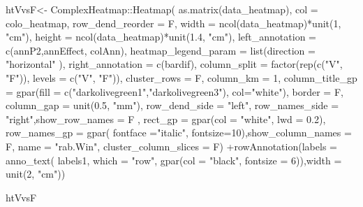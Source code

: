 \documentclass[]{interact}
\theoremstyle{plain}%
\theoremstyle{definition}
\theoremstyle{remark}
\newenvironment{Shaded}{\begin{snugshade}}{\end{snugshade}}
\newcommand{\AttributeTok}[1]{\textcolor[rgb]{0.77,0.63,0.00}{#1}}
\newcommand{\DecValTok}[1]{\textcolor[rgb]{0.00,0.00,0.81}{#1}}
\newcommand{\FloatTok}[1]{\textcolor[rgb]{0.00,0.00,0.81}{#1}}
\newcommand{\FunctionTok}[1]{\textcolor[rgb]{0.00,0.00,0.00}{#1}}
\newcommand{\NormalTok}[1]{#1}
\newcommand{\OtherTok}[1]{\textcolor[rgb]{0.56,0.35,0.01}{#1}}
\newcommand{\SpecialCharTok}[1]{\textcolor[rgb]{0.00,0.00,0.00}{#1}}
\newcommand{\StringTok}[1]{\textcolor[rgb]{0.31,0.60,0.02}{#1}}
\begin{document}
\begin{Shaded}
\begin{Highlighting}[]
\NormalTok{htVvsF}\OtherTok{\textless{}{-}}\NormalTok{  ComplexHeatmap}\SpecialCharTok{::}\FunctionTok{Heatmap}\NormalTok{(}
  \FunctionTok{as.matrix}\NormalTok{(data\_heatmap), }\AttributeTok{col =}\NormalTok{ colo\_heatmap, }\AttributeTok{row\_dend\_reorder =}\NormalTok{ F,                                   }\AttributeTok{width =} \FunctionTok{ncol}\NormalTok{(data\_heatmap)}\SpecialCharTok{*}\FunctionTok{unit}\NormalTok{(}\DecValTok{1}\NormalTok{, }\StringTok{"cm"}\NormalTok{),}
  \AttributeTok{height =} \FunctionTok{ncol}\NormalTok{(data\_heatmap)}\SpecialCharTok{*}\FunctionTok{unit}\NormalTok{(}\FloatTok{1.4}\NormalTok{, }\StringTok{"cm"}\NormalTok{),}
  \AttributeTok{left\_annotation =}  \FunctionTok{c}\NormalTok{(annP2,annEffect, colAnn),}
  \AttributeTok{heatmap\_legend\_param =} \FunctionTok{list}\NormalTok{(}\AttributeTok{direction =} \StringTok{"horizontal"}\NormalTok{ ),}
  \AttributeTok{right\_annotation =} \FunctionTok{c}\NormalTok{(bardif),}
  \AttributeTok{column\_split =} \FunctionTok{factor}\NormalTok{(}\FunctionTok{rep}\NormalTok{(}\FunctionTok{c}\NormalTok{(}\StringTok{"V"}\NormalTok{, }\StringTok{"F"}\NormalTok{)), }\AttributeTok{levels =} \FunctionTok{c}\NormalTok{(}\StringTok{"V"}\NormalTok{, }\StringTok{"F"}\NormalTok{)),}
  \AttributeTok{cluster\_rows =}\NormalTok{ F, }\AttributeTok{column\_km =} \DecValTok{1}\NormalTok{, }
  \AttributeTok{column\_title\_gp =} \FunctionTok{gpar}\NormalTok{(}\AttributeTok{fill =} \FunctionTok{c}\NormalTok{(}\StringTok{"darkolivegreen1"}\NormalTok{,}\StringTok{"darkolivegreen3"}\NormalTok{), }\AttributeTok{col=}\StringTok{"white"}\NormalTok{),}
  \AttributeTok{border =}\NormalTok{ F, }\AttributeTok{column\_gap =} \FunctionTok{unit}\NormalTok{(}\FloatTok{0.5}\NormalTok{, }\StringTok{"mm"}\NormalTok{), }\AttributeTok{row\_dend\_side =} \StringTok{"left"}\NormalTok{,}
  \AttributeTok{row\_names\_side =} \StringTok{"right"}\NormalTok{,}\AttributeTok{show\_row\_names =}\NormalTok{ F ,}
  \AttributeTok{rect\_gp =} \FunctionTok{gpar}\NormalTok{(}\AttributeTok{col =} \StringTok{"white"}\NormalTok{, }\AttributeTok{lwd =} \FloatTok{0.2}\NormalTok{), }\AttributeTok{row\_names\_gp =} \FunctionTok{gpar}\NormalTok{(}
  \AttributeTok{fontface =}\StringTok{"italic"}\NormalTok{, }\AttributeTok{fontsize=}\DecValTok{10}\NormalTok{),}\AttributeTok{show\_column\_names =}\NormalTok{ F, }\AttributeTok{name =} \StringTok{"rab.Win"}\NormalTok{,}
  \AttributeTok{cluster\_column\_slices =}\NormalTok{ F) }\SpecialCharTok{+}\FunctionTok{rowAnnotation}\NormalTok{(}\AttributeTok{labels =} \FunctionTok{anno\_text}\NormalTok{(}
\NormalTok{  labels1, }\AttributeTok{which =} \StringTok{"row"}\NormalTok{, }\FunctionTok{gpar}\NormalTok{(}\AttributeTok{col =} \StringTok{"black"}\NormalTok{, }\AttributeTok{fontsize =} \DecValTok{6}\NormalTok{)),}\AttributeTok{width =} \FunctionTok{unit}\NormalTok{(}\DecValTok{2}\NormalTok{, }\StringTok{"cm"}\NormalTok{))}


\NormalTok{htVvsF}
\end{Highlighting}
\end{Shaded}
\end{document}
